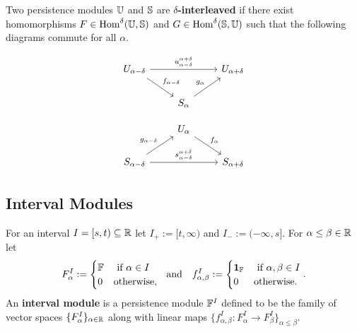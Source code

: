 \begin{definition}[Interleaving]
  Two persistence modules $\U$ and $\S$ are \textbf{$\delta$-interleaved} if there exist homomorphisms $F\in\Hom^\delta(\U, \S)$ and $G \in\Hom^\delta(\S,\U)$ such that the following diagrams commute for all $\alpha$.

  \begin{minipage}{0.45\textwidth}
  \begin{equation}\label{dgm:interleaving1}
    \begin{tikzcd}
      U_{\alpha-\delta}\arrow{rr}{u_{\alpha-\delta}^{\alpha+\delta}}\arrow{dr}{f_{\alpha-\delta}} & &
      U_{\alpha+\delta}\\
      & S_{\alpha}\arrow{ur}{g_\alpha} &
  \end{tikzcd}\end{equation}
  \end{minipage}
  \begin{minipage}{0.45\textwidth}
  \begin{equation}\label{dgm:interleaving2}
    \begin{tikzcd}
      & U_{\alpha}\arrow{dr}{f_\alpha} &\\
      S_{\alpha-\delta}\arrow{rr}{s_{\alpha-\delta}^{\alpha+\delta}}\arrow{ur}{g_{\alpha-\delta}} & &
      S_{\alpha+\delta}
  \end{tikzcd}\end{equation}
  \end{minipage}
\end{definition}

\subsection{Interval Modules}

For an interval $I = [s,t)\subseteq \R$ let $I_+ := [t,\infty)$ and $I_- := (-\infty, s]$.
For $\alpha\leq\beta\in\R$ let
\[ F_\alpha^I := \begin{cases} \FF&\text{ if } \alpha\in I\\ 0 &\text{otherwise,}\end{cases}\ \text{ and }\ \ f_{\alpha,\beta}^I := \begin{cases} \id_\FF&\text{ if } \alpha,\beta\in I\\ 0&\text{otherwise.}\end{cases}.\]
An \textbf{interval module} is a persistence module $\FF^I$ defined to be the family of vector spaces $\{F_\alpha^I\}_{\alpha\in\R}$ along with linear maps $\{f_{\alpha,\beta}^I : F_\alpha^I\to F_\beta^I\}_{\alpha\leq\beta}$.

